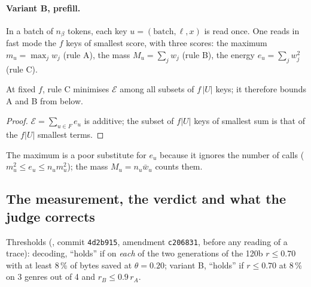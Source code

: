 \paragraph{Variant B, prefill.} In a batch of $n_\beta$ tokens, each key $u = (\text{batch}, \ell, x)$ is read once. One reads in fast mode the $f$ keys of smallest score, with three scores: the maximum $m_u = \max_j w_j$ (rule A), the mass $M_u = \sum_j w_j$ (rule B), the energy $e_u = \sum_j w_j^2$ (rule C).

\begin{proposition}\label{t3mim:prop:p6-oracle}
At fixed $f$, rule C minimises $\mathcal E$ among all subsets of $f\,|U|$ keys; it therefore bounds A and B from below.
\end{proposition}
\begin{proof}
$\mathcal E = \sum_{u \in F} e_u$ is additive; the subset of $f|U|$ keys of smallest sum is that of the $f|U|$ smallest terms.
\end{proof}
The maximum is a poor substitute for $e_u$ because it ignores the number of calls ($m_u^2 \le e_u \le n_u m_u^2$); the mass $M_u = n_u \bar w_u$ counts them.

\subsection{The measurement, the verdict and what the judge corrects}\label{t3mim:sec:p6-verdict}

Thresholds (, commit \texttt{4d2b915}, amendment \texttt{c206831}, before any reading of a trace): decoding, ``holds'' if on \emph{each} of the two generations of the 120b $r \le 0.70$ with at least 8\,\% of bytes saved at $\theta = 0.20$; variant B, ``holds'' if $r \le 0.70$ at 8\,\% on 3 genres out of 4 and $r_B \le 0.9\,r_A$.

